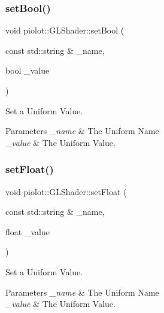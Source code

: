 \subsubsection{\texorpdfstring{set\+Bool()}{setBool()}}
{\footnotesize\ttfamily void piolot\+::\+G\+L\+Shader\+::set\+Bool (\begin{DoxyParamCaption}\item[{const std\+::string \&}]{\+\_\+name,  }\item[{bool}]{\+\_\+value }\end{DoxyParamCaption})\hspace{0.3cm}{\ttfamily [inline]}}



Set a Uniform Value. 


\begin{DoxyParams}{Parameters}
{\em \+\_\+name} & The Uniform Name \\
\hline
{\em \+\_\+value} & The Uniform Value. \\
\hline
\end{DoxyParams}
\mbox{\label{classpiolot_1_1_g_l_shader_af6323e1d0956064de4c43ef4fa41b0f1}} 
\subsubsection{\texorpdfstring{set\+Float()}{setFloat()}}
{\footnotesize\ttfamily void piolot\+::\+G\+L\+Shader\+::set\+Float (\begin{DoxyParamCaption}\item[{const std\+::string \&}]{\+\_\+name,  }\item[{float}]{\+\_\+value }\end{DoxyParamCaption})\hspace{0.3cm}{\ttfamily [inline]}}



Set a Uniform Value. 


\begin{DoxyParams}{Parameters}
{\em \+\_\+name} & The Uniform Name \\
\hline
{\em \+\_\+value} & The Uniform Value. \\
\hline
\end{DoxyParams}
\mbox{\label{classpiolot_1_1_g_l_shader_a5b8fd3a108bf576243a1e852872edf5c}} 
